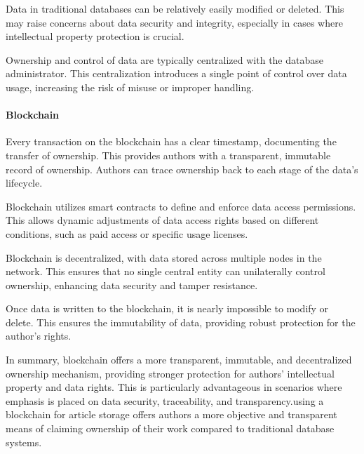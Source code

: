 \documentclass[lettersize,journal]{IEEEtran}
\begin{document}
Data in traditional databases can be relatively easily modified or deleted. This may raise concerns about data security and integrity, especially in cases where intellectual property protection is crucial.

Ownership and control of data are typically centralized with the database administrator. This centralization introduces a single point of control over data usage, increasing the risk of misuse or improper handling.

\paragraph{Blockchain}

Every transaction on the blockchain has a clear timestamp, documenting the transfer of ownership. This provides authors with a transparent, immutable record of ownership. Authors can trace ownership back to each stage of the data's lifecycle.

Blockchain utilizes smart contracts to define and enforce data access permissions. This allows dynamic adjustments of data access rights based on different conditions, such as paid access or specific usage licenses.

Blockchain is decentralized, with data stored across multiple nodes in the network. This ensures that no single central entity can unilaterally control ownership, enhancing data security and tamper resistance.

Once data is written to the blockchain, it is nearly impossible to modify or delete. This ensures the immutability of data, providing robust protection for the author's rights.

In summary, blockchain offers a more transparent, immutable, and decentralized ownership mechanism, providing stronger protection for authors' intellectual property and data rights. This is particularly advantageous in scenarios where emphasis is placed on data security, traceability, and transparency.using a blockchain for article storage offers authors a more objective and transparent means of claiming ownership of their work compared to traditional database systems.
\end{document}
